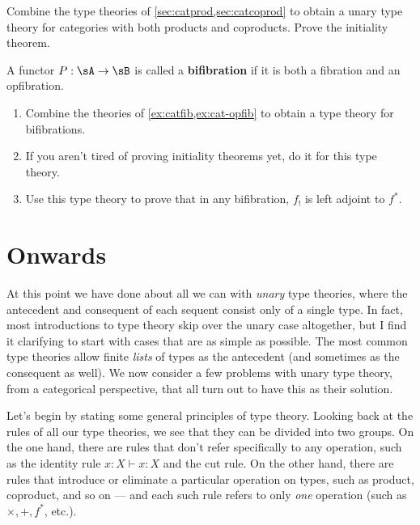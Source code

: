 \documentclass{book}
\let\types\vdash
\begin{document}
\begin{ex}\label{ex:cat-prod-coprod}
  Combine the type theories of \cref{sec:catprod,sec:catcoprod} to obtain a unary type theory for categories with both products and coproducts.
  Prove the initiality theorem.
\end{ex}

\begin{ex}\label{ex:cat-bifib}
  A functor $P:\sA\to\sB$ is called a \textbf{bifibration} if it is both a fibration and an opfibration.
  \begin{enumerate}
  \item Combine the theories of \cref{ex:catfib,ex:cat-opfib} to obtain a type theory for bifibrations.
  \item If you aren't tired of proving initiality theorems yet, do it for this type theory.
  \item Use this type theory to prove that in any bifibration, $f_!$ is left adjoint to $f^*$.
  \end{enumerate}
\end{ex}

\section{Onwards}
\label{sec:why-multicats}

At this point we have done about all we can with \emph{unary} type theories, where the antecedent and consequent of each sequent consist only of a single type.
In fact, most introductions to type theory skip over the unary case altogether, but I find it clarifying to start with cases that are as simple as possible.
The most common type theories allow finite \emph{lists} of types as the antecedent (and sometimes as the consequent as well).
We now consider a few problems with unary type theory, from a categorical perspective, that all turn out to have this as their solution.

Let's begin by stating some general principles of type theory.
Looking back at the rules of all our type theories, we see that they can be divided into two groups.
On the one hand, there are rules that don't refer specifically to any operation, such as the identity rule $x:X \types x:X$ and the cut rule.
On the other hand, there are rules that introduce or eliminate a particular operation on types, such as product, coproduct, and so on --- and each such rule refers to only \emph{one} operation  (such as $\times,+,f^*$, etc.).
\end{document}
